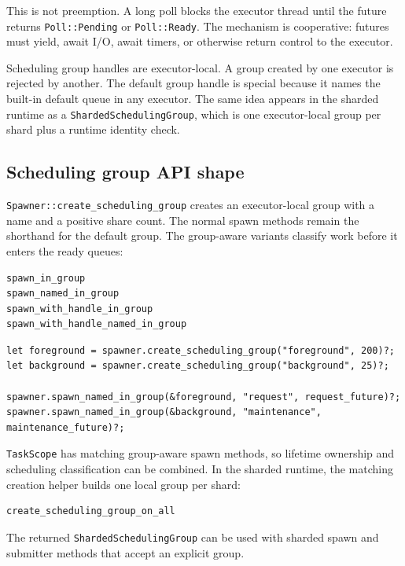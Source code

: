 This is not preemption. A long poll blocks the executor thread until the
future returns \texttt{Poll::Pending} or \texttt{Poll::Ready}. The mechanism is
cooperative: futures must yield, await I/O, await timers, or otherwise return
control to the executor.

Scheduling group handles are executor-local. A group created by one executor is
rejected by another. The default group handle is special because it names the
built-in default queue in any executor. The same idea appears in the sharded
runtime as a \texttt{ShardedSchedulingGroup}, which is one executor-local group
per shard plus a runtime identity check.

\subsection{Scheduling group API shape}

\texttt{Spawner::create\_scheduling\_group} creates an executor-local group
with a name and a positive share count. The normal spawn methods remain the
shorthand for the default group. The group-aware variants classify work before
it enters the ready queues:

\begin{lstlisting}[language={},caption={Local group-aware spawn methods}]
spawn_in_group
spawn_named_in_group
spawn_with_handle_in_group
spawn_with_handle_named_in_group
\end{lstlisting}

\begin{lstlisting}[language={},caption={Classifying local tasks}]
let foreground = spawner.create_scheduling_group("foreground", 200)?;
let background = spawner.create_scheduling_group("background", 25)?;

spawner.spawn_named_in_group(&foreground, "request", request_future)?;
spawner.spawn_named_in_group(&background, "maintenance", maintenance_future)?;
\end{lstlisting}

\texttt{TaskScope} has matching group-aware spawn methods, so lifetime ownership
and scheduling classification can be combined. In the sharded runtime, the
matching creation helper builds one local group per shard:

\begin{lstlisting}[language={},caption={Sharded group creation}]
create_scheduling_group_on_all
\end{lstlisting}

The returned \texttt{ShardedSchedulingGroup} can be used with sharded spawn and
submitter methods that accept an explicit group.

